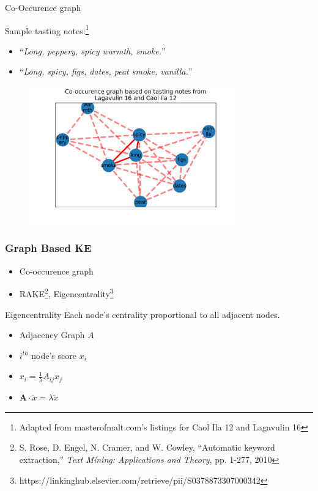 \documentclass{beamer}
\begin{document}
\begin{frame}{Co-Occurence graph}
    
        Sample tasting notes:\footnote{Adapted from masterofmalt.com's listings for Caol Ila 12 and Lagavulin 16}
        \begin{itemize}
            \item ``\emph{Long, peppery, spicy warmth, smoke.}''
            \item ``\emph{Long, spicy, figs, dates, peat smoke, vanilla.}''
        \end{itemize}
        \begin{figure}[!htb]
            \centering
            \includegraphics[width=0.8\textwidth]{graphics/Graph}
        \end{figure}
    
\end{frame}

\begin{frame}
    \frametitle{Graph Based KE}
    \begin{itemize}
        \item Co-occurence graph
        \item RAKE\footnote{ S. Rose, D. Engel, N. Cramer, and W. Cowley, 
        ``Automatic keyword extraction,'' \emph{Text Mining:
        Applications and Theory}, pp. 1-277, 2010}, Eigencentrality\footnote{https://linkinghub.elsevier.com/retrieve/pii/S0378873307000342}
    \end{itemize}
    \begin{block}{Eigencentrality}
        Each node's centrality proportional to all adjacent nodes.
        \begin{itemize}
            \item Adjacency Graph $A$ 
            \item $i^{th}$ node's score $x_i$ 
            \item $x_i = \frac{1}{\lambda}A_{ij}x_j$
            \item $\textbf{A}\cdot \utilde{x} = \lambda \utilde{x}$
        \end{itemize}

    \end{block}
\end{frame}
\end{document}
